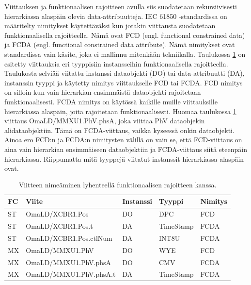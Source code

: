Viittauksen ja funktionaalisen rajoitteen avulla siis suodatetaan rekursiivisesti hierarkiassa alaspäin olevia data-attribuutteja. IEC 61850 -standardissa on määritelty nimitykset käytettäväksi kun jotakin viittausta suodatetaan funktionaalisella rajoitteella. Nämä ovat FCD (engl. functional constrained data) ja FCDA (engl. functional constrained data attribute). Nämä nimitykset ovat standardissa vain käsite, joka ei mallinnu mitenkään tekniikalla. Taulukossa \ref{tab:fcd-ja-fcda} on esitetty viittauksia eri tyyppisiin instansseihin funktionaalisella rajoitteella. Taulukosta selviää viitattu instanssi dataobjekti (DO) tai data-attribuutti (DA), instanssin tyyppi ja käytetty nimitys viittaukselle FCD tai FCDA. FCD nimitys on silloin kun vain hierarkian ensimmäistä dataobjekti rajoitetaan funktionaalisesti. FCDA nimitys on käytössä kaikille muille viittauksille hierarkiassa alaspäin, joita rajoitetaan funktionaalisesti. Huomaa taulukossa \ref{tab:fcd-ja-fcda} viittaus OmaLD/MMXU1.PhV.phsA, joka viittaa PhV dataobjekin alidataobjektiin. Tämä on FCDA-viittaus, vaikka kyseessä onkin dataobjekti. Ainoa ero FCD:n ja FCDA:n nimitysten välillä on vain se, että FCD-viittaus on aina vain hierarkian ensimmäiseen dataobjektiin ja FCDA-viittaus siitä eteenpäin hierarkiassa. Riippumatta mitä tyyppejä viitatut instanssit hierarkiassa alaspäin ovat. \cite[s.~55]{IEC61850-7-2} \cite[s.~63]{IEC61850-8-1}

\begin{table}[ht!]
	\caption{Viitteen nimeäminen lyhenteellä funktionaalisen rajoitteen kanssa.}
	\label{tab:fcd-ja-fcda}
	\begin{tabular}{l | l | l | l | l}
		\hline
		\textbf{FC} & \textbf{Viite} & \textbf{Instanssi} & \textbf{Tyyppi} & \textbf{Nimitys} \\
		\hline \hline
		ST & OmaLD/XCBR1.Pos & DO & DPC & FCD \\
		ST & OmaLD/XCBR1.Pos.t & DA & TimeStamp & FCDA \\
		ST & OmaLD/XCBR1.Pos.ctlNum & DA & INT8U & FCDA \\
		MX & OmaLD/MMXU1.PhV & DO & WYE & FCD \\
		MX & OmaLD/MMXU1.PhV.phsA & DO & CMV & FCDA \\
		MX & OmaLD/MMXU1.PhV.phsA.t & DA & TimeStamp & FCDA \\
		\hline
	\end{tabular}
\end{table}

